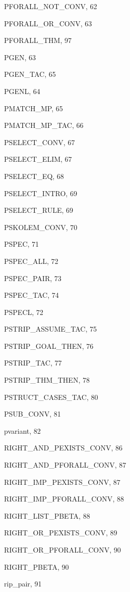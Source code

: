 \begin{theindex}
  \item {\ptt PFORALL\_NOT\_CONV}, 62
  \item {\ptt PFORALL\_OR\_CONV}, 63
  \item {\ptt PFORALL\_THM}, 97
  \item {\ptt PGEN}, 63
  \item {\ptt PGEN\_TAC}, 65
  \item {\ptt PGENL}, 64
  \item {\ptt PMATCH\_MP}, 65
  \item {\ptt PMATCH\_MP\_TAC}, 66
  \item {\ptt PSELECT\_CONV}, 67
  \item {\ptt PSELECT\_ELIM}, 67
  \item {\ptt PSELECT\_EQ}, 68
  \item {\ptt PSELECT\_INTRO}, 69
  \item {\ptt PSELECT\_RULE}, 69
  \item {\ptt PSKOLEM\_CONV}, 70
  \item {\ptt PSPEC}, 71
  \item {\ptt PSPEC\_ALL}, 72
  \item {\ptt PSPEC\_PAIR}, 73
  \item {\ptt PSPEC\_TAC}, 74
  \item {\ptt PSPECL}, 72
  \item {\ptt PSTRIP\_ASSUME\_TAC}, 75
  \item {\ptt PSTRIP\_GOAL\_THEN}, 76
  \item {\ptt PSTRIP\_TAC}, 77
  \item {\ptt PSTRIP\_THM\_THEN}, 78
  \item {\ptt PSTRUCT\_CASES\_TAC}, 80
  \item {\ptt PSUB\_CONV}, 81
  \item {\ptt pvariant}, 82

  \indexspace

  \item {\ptt RIGHT\_AND\_PEXISTS\_CONV}, 86
  \item {\ptt RIGHT\_AND\_PFORALL\_CONV}, 87
  \item {\ptt RIGHT\_IMP\_PEXISTS\_CONV}, 87
  \item {\ptt RIGHT\_IMP\_PFORALL\_CONV}, 88
  \item {\ptt RIGHT\_LIST\_PBETA}, 88
  \item {\ptt RIGHT\_OR\_PEXISTS\_CONV}, 89
  \item {\ptt RIGHT\_OR\_PFORALL\_CONV}, 90
  \item {\ptt RIGHT\_PBETA}, 90
  \item {\ptt rip\_pair}, 91


\end{theindex}
